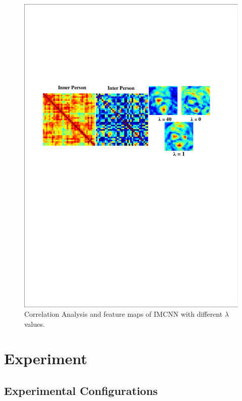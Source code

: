\documentclass[wcp]{jmlr}
\begin{document}
	\begin{figure}[htb]
		\begin{center}
			\centering\includegraphics[width=16cm]{./new_imgs/CorrelationAndFeature.pdf}
		\end{center}
		\caption[short]{Correlation Analysis and feature maps of IMCNN with different $\lambda$ values.}
		\label{attr_corr}
	\end{figure}
	
	\section{Experiment}
	
	\subsection{Experimental Configurations}
	
\end{document}
